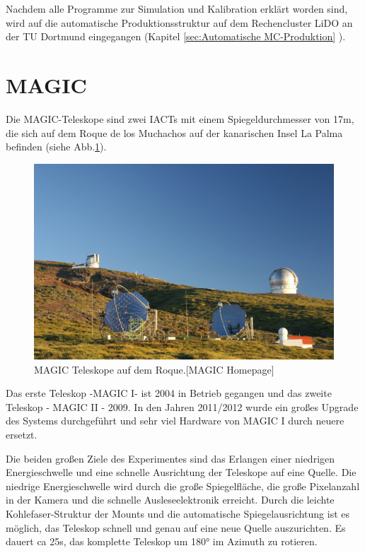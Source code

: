 Nachdem alle Programme zur Simulation und Kalibration erklärt worden sind, wird auf die automatische Produktionsstruktur auf dem Rechencluster LiDO an der TU Dortmund eingegangen (Kapitel \ref{sec:Automatische MC-Produktion} ).



\section{MAGIC}
\label{sec:MAGIC}

Die MAGIC-Teleskope sind zwei IACTs mit einem Spiegeldurchmesser von 17m, die sich auf dem Roque de los Muchachos auf der kanarischen Insel La Palma befinden (siehe Abb.\ref{MAGIC Teleskope}).

\begin{figure}
    \centering
    \includegraphics[width=\textwidth]{./Plots/03_MonteCarlos/MAGIC-Telescopes.jpg}
    \caption{MAGIC Teleskope auf dem Roque.[MAGIC Homepage]}
    \label{MAGIC Teleskope}
\end{figure}

Das erste Teleskop -MAGIC I- ist 2004 in Betrieb gegangen und das zweite Teleskop - MAGIC II - 2009.
In den Jahren 2011/2012 wurde ein großes Upgrade des Systems durchgeführt und sehr viel Hardware von MAGIC I durch neuere ersetzt.

Die beiden großen Ziele des Experimentes sind das Erlangen einer niedrigen Energieschwelle und eine schnelle Ausrichtung der Teleskope auf eine Quelle.
Die niedrige Energieschwelle wird durch die große Spiegelfläche, die große Pixelanzahl in der Kamera und die schnelle Ausleseelektronik erreicht.
Durch die leichte Kohlefaser-Struktur der Mounts und die automatische Spiegelausrichtung ist es möglich, das Teleskop schnell und genau auf eine neue Quelle auszurichten.
Es dauert ca 25s, das komplette Teleskop um 180° im Azimuth zu rotieren.

